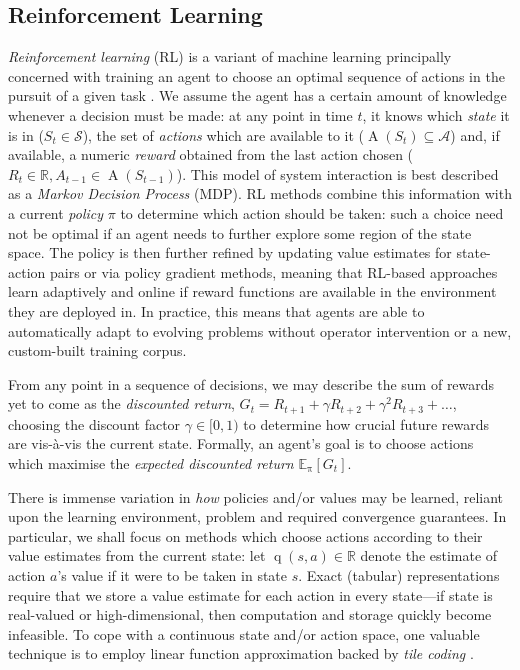 \documentclass[10pt, times, conference, letterpaper]{IEEEtran}
\begin{document}
\subsection{Reinforcement Learning}\label{sec:reinforcement-learning}
\emph{Reinforcement learning} (RL) is a variant of machine learning principally concerned with training an agent to choose an optimal sequence of actions in the pursuit of a given task \cite{RL2E}.
We assume the agent has a certain amount of knowledge whenever a decision must be made: at any point in time $t$, it knows which \emph{state} it is in ($S_t \in \mathcal{S}$), the set of \emph{actions} which are available to it ($\operatorname{A}(S_t) \subseteq \mathcal{A}$) and, if available, a numeric \emph{reward} obtained from the last action chosen ($R_t \in \mathbb{R}, A_{t-1} \in \operatorname{A}(S_{t-1})$).
This model of system interaction is best described as a \emph{Markov Decision Process} (MDP).
RL methods combine this information with a current \emph{policy} $\pi$ to determine which action should be taken: such a choice need not be optimal if an agent needs to further explore some region of the state space.
The policy is then further refined by updating value estimates for state-action pairs or via policy gradient methods, meaning that RL-based approaches learn adaptively and online if reward functions are available in the environment they are deployed in.
In practice, this means that agents are able to automatically adapt to evolving problems without operator intervention or a new, custom-built training corpus.

From any point in a sequence of decisions, we may describe the sum of rewards yet to come as the \emph{discounted return}, $G_t = R_{t+1} + \gamma R_{t+2} + \gamma^2 R_{t+3} + \ldots$, choosing the discount factor $\gamma \in [0,1)$ to determine how crucial future rewards are vis-\`{a}-vis the current state.
Formally, an agent's goal is to choose actions which maximise the \emph{expected discounted return} $\operatorname{\mathbb{E}_{\pi}}[G_t]$.


There is immense variation in \emph{how} policies and/or values may be learned, reliant upon the learning environment, problem and required convergence guarantees.
In particular, we shall focus on methods which choose actions according to their value estimates from the current state: let $\operatorname{q}(s, a) \in \mathbb{R}$ denote the estimate of action $a$'s value if it were to be taken in state $s$.
Exact (tabular) representations require that we store a value estimate for each action in every state---if state is real-valued or high-dimensional, then computation and storage quickly become infeasible.
To cope with a continuous state and/or action space, one valuable technique is to employ linear function approximation backed by \emph{tile coding} \cite[pp.\ \numrange{217}{221}]{RL2E}.
\end{document}
